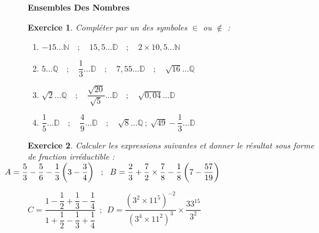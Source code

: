 \documentclass[12pt,a4paper]{article}
\theoremstyle{mystyle}
\newtheorem{exo}{Exercice}
\begin{document}
\pagestyle{fancy}
\fancyhf{} %
\fancyfoot[C]{\thepage} %


\begin{center}
    \textbf{\Large Ensembles Des Nombres}
\end{center}
\begin{multicols*}{2}

\begin{exo}
Compléter par un des symboles $\in$ ou $\not\in$ :
	\begin{enumerate}
		\item $-15\dots \mathbb{N}\quad;\quad 15,5\dots\mathbb{D}\quad;\quad 2\times 10,5\dots\mathbb{N}$
		\item $5\dots \mathbb{Q}\quad;\quad \dfrac{1}{3}\dots\mathbb{D}\quad;\quad 7,55\dots\mathbb{D}\quad;\quad \sqrt{16}\dots\mathbb{Q}$
		\item $\sqrt{2}\dots \mathbb{Q}\quad;\quad \dfrac{\sqrt{20}}{\sqrt{5}}\dots\mathbb{D}\quad;\quad \sqrt{0,04}\dots\mathbb{D}$
		\item $\dfrac{1}{5}\dots\mathbb{D}\quad;\quad \dfrac{4}{9}\dots\mathbb{D}\quad;\quad \sqrt{8}\dots\mathbb{Q}\ ;\ \sqrt{49}-\dfrac{1}{3}\dots\mathbb{D}$
	\end{enumerate}
\end{exo}

\begin{exo}
Calculer les expressions suivantes et donner le résultat sous forme de fraction irréductible :\\

		$\hspace{-10mm} A = \dfrac{5}{3} - \dfrac{5}{6} - \dfrac{1}{3}\left(3 - \dfrac{3}{4}\right)\ \ ; \ \ B = \dfrac{2}{3} + \dfrac{7}{2}\times\dfrac{7}{8} - \dfrac{1}{8}\left(7 - \dfrac{57}{19} \right)$
		
		
		 $C = \dfrac{1-\dfrac{1}{2} + \dfrac{1}{3} - \dfrac{1}{4}}{1 + \dfrac{1}{2} - \dfrac{1}{3} + \dfrac{1}{4}}\ \ ; \ \ D = \dfrac{(3^2\times 11^5)^{-2}}{(3^4\times 11^2)^3}\times\dfrac{33^{15}}{3^2}$
				

\end{exo}


\end{multicols*}
\end{document}
